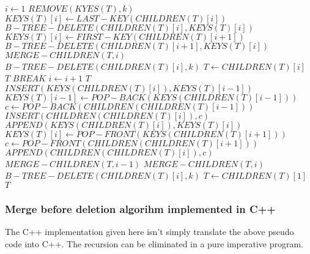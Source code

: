 \documentclass{article}
\begin{document}
\begin{algorithmic}[1]
  \State $i \leftarrow 1$
       
        \State $REMOVE(KYES(T), k)$
      \Else {}
         
          \State $KEYS(T)[i] \leftarrow LAST-KEY(CHILDREN(T)[i])$
          \State $B-TREE-DELETE(CHILDREN(T)[i], KEYS(T)[i])$
         
          \State $KEYS(T)[i] \leftarrow FIRST-KEY(CHILDREN(T)[i+1])$
          \State $B-TREE-DELETE(CHILDREN(T)[i+1], KEYS(T)[i])$
        \Else {}
          \State $MERGE-CHILDREN(T, i)$
          \State $B-TREE-DELETE(CHILDREN(T)[i], k)$
            \State $T \leftarrow CHILDREN(T)[i]$ 
          \EndIf
        \EndIf
      \EndIf
      \State \Return $T$
      \State $BREAK$
    \Else
      \State $i \leftarrow i+1$
    \EndIf
  \EndWhile
  \Statex
    \State \Return $T$ 
  \EndIf
    
     
      \State $INSERT(KEYS(CHILDREN(T)[i]), KEYS(T)[i-1])$
      \State $KEYS(T)[i-1] \leftarrow POP-BACK(KEYS(CHILDREN(T)[i-1]))$
        \State $c \leftarrow POP-BACK(CHILDREN(CHILDREN(T)[i-1]))$
        \State $INSERT(CHILDREN(CHILDREN(T)[i]), c)$
      \EndIf
     
      \State $APPEND(KEYS(CHILDREN(T)[i]), KEYS(T)[i])$
      \State $KEYS(T)[i] \leftarrow POP-FRONT(KEYS(CHILDREN(T)[i+1]))$
        \State $c \leftarrow POP-FRONT(CHILDREN(CHILDREN(T)[i+1]))$
        \State $APPEND(CHILDREN(CHILDREN(T)[i]), c)$
      \EndIf
    \Else {}
        \State $MERGE-CHILDREN(T, i-1)$
      \Else
        \State $MERGE-CHILDREN(T, i)$
      \EndIf
    \EndIf
  \EndIf
  \State $B-TREE-DELETE(CHILDREN(T)[i], k)$ 
   
    \State $T \gets CHILDREN(T)[1]$
  \EndIf
  \State \Return $T$
\EndFunction
\end{algorithmic}

\subsubsection{Merge before deletion algorihm implemented in C++}
The C++ implementation given here isn't simply translate the above
pseudo code into C++. The recursion can be eliminated in a pure
imperative program.
\end{document}
